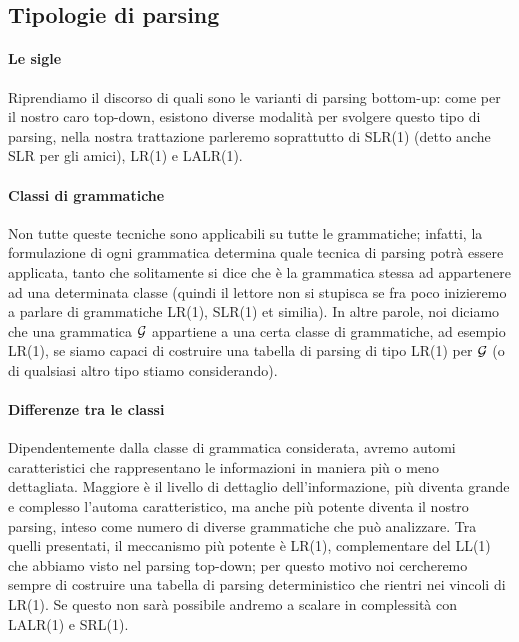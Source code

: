\documentclass[class=book, crop=false, oneside, 12pt]{standalone}
\begin{document}
\subsection{Tipologie di parsing}
\paragraph{Le sigle}
Riprendiamo il discorso di quali sono le varianti di parsing bottom-up: come per il nostro caro top-down, esistono diverse modalità per svolgere questo tipo di parsing, nella nostra trattazione parleremo soprattutto di SLR(1) (detto anche SLR per gli amici), LR(1) e LALR(1).

\paragraph{Classi di grammatiche}
Non tutte queste tecniche sono applicabili su tutte le grammatiche; infatti, la formulazione di ogni grammatica determina quale tecnica di parsing potrà essere applicata, tanto che solitamente si dice che è la grammatica stessa ad appartenere ad una determinata classe (quindi il lettore non si stupisca se fra poco inizieremo a parlare di grammatiche LR(1), SLR(1) et similia). In altre parole, noi diciamo che una grammatica \(\mathcal{G}\) appartiene a una certa classe di grammatiche, ad esempio LR(1), se siamo capaci di costruire una tabella di parsing di tipo LR(1) per \(\mathcal{G}\) (o di qualsiasi altro tipo stiamo considerando).
\paragraph{Differenze tra le classi}
Dipendentemente dalla classe di grammatica considerata, avremo automi caratteristici che rappresentano le informazioni in maniera più o meno dettagliata. Maggiore è il livello di dettaglio dell'informazione, più diventa grande e complesso l'automa caratteristico, ma anche più potente diventa il nostro parsing, inteso come numero di diverse grammatiche che può analizzare. Tra quelli presentati, il meccanismo più potente è LR(1), complementare del LL(1) che abbiamo visto nel parsing top-down; per questo motivo noi cercheremo sempre di costruire una tabella di parsing deterministico che rientri nei vincoli di LR(1). Se questo non sarà possibile andremo a scalare in complessità con LALR(1) e SRL(1).
\end{document}
